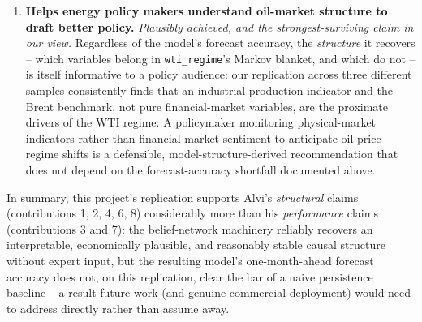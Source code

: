 \begin{enumerate}
    further validation.
  \item \textbf{Helps energy policy makers understand oil-market
    structure to draft better policy.} \emph{Plausibly achieved, and
    the strongest-surviving claim in our view.} Regardless of the
    model's forecast accuracy, the \emph{structure} it recovers --
    which variables belong in \texttt{wti\_regime}'s Markov blanket, and
    which do not -- is itself informative to a policy audience: our
    replication across three different samples consistently finds that
    an industrial-production indicator and the Brent benchmark, not
    pure financial-market variables, are the proximate drivers of the
    WTI regime. A policymaker monitoring physical-market indicators
    rather than financial-market sentiment to anticipate oil-price
    regime shifts is a defensible, model-structure-derived
    recommendation that does not depend on the forecast-accuracy
    shortfall documented above.
\end{enumerate}

In summary, this project's replication supports Alvi's \emph{structural}
claims (contributions 1, 2, 4, 6, 8) considerably more than his
\emph{performance} claims (contributions 3 and 7): the belief-network
machinery reliably recovers an interpretable, economically plausible,
and reasonably stable causal structure without expert input, but the
resulting model's one-month-ahead forecast accuracy does not, on this
replication, clear the bar of a naive persistence baseline -- a result
future work (and genuine commercial deployment) would need to address
directly rather than assume away.
